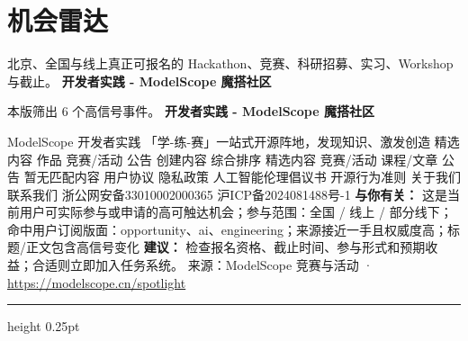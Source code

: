 \documentclass[10.5pt]{ctexart}
\begin{document}
\section*{机会雷达}
{\color{ormuted} 北京、全国与线上真正可报名的 Hackathon、竞赛、科研招募、实习、Workshop 与截止。}
\vspace{2mm}
{\LARGE\bfseries 开发者实践 - ModelScope 魔搭社区}\par
\vspace{1mm}
{\color{ormuted} 本版筛出 6 个高信号事件。}
\vspace{3mm}
{\Large\bfseries 开发者实践 - ModelScope 魔搭社区}\par
ModelScope 开发者实践 「学-练-赛」一站式开源阵地，发现知识、激发创造 精选内容 作品 竞赛/活动 公告 创建内容 综合排序 精选内容 竞赛/活动 课程/文章 公告 暂无匹配内容 用户协议 隐私政策 人工智能伦理倡议书 开源行为准则 关于我们 联系我们 浙公网安备33010002000365 沪ICP备2024081488号-1
\textbf{与你有关：} 这是当前用户可实际参与或申请的高可触达机会；参与范围：全国 / 线上 / 部分线下；命中用户订阅版面：opportunity、ai、engineering；来源接近一手且权威度高；标题/正文包含高信号变化
\textbf{建议：} 检查报名资格、截止时间、参与形式和预期收益；合适则立即加入任务系统。
{\footnotesize\color{ormuted} 来源：ModelScope 竞赛与活动 · \url{https://modelscope.cn/spotlight}}
\vspace{4mm}
\hrule height 0.25pt
\vspace{3mm}
\end{document}
